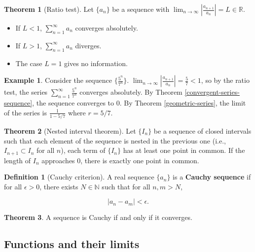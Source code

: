 \documentclass{article}
\theoremstyle{definition}
\newtheorem{definition}{Definition}[section]
\newtheorem{example}{Example}[section]
\newtheorem{theorem}{Theorem}[section]
\begin{document}
\begin{theorem}[Ratio test]
Let $\{a_n\}$ be a sequence with $\lim_{n \to \infty} |\frac{a_{n+1}}{a_n}| = L \in \mathbb{R}$.

\begin{itemize}
\item If $L < 1$, $\sum\limits_{n=1}^\infty a_n$ converges absolutely.
\item If $L > 1$, $\sum\limits_{n=1}^\infty a_n$ diverges.
\item The case $L = 1$ gives no information.
\end{itemize}
\end{theorem}

\begin{example}
Consider the sequence $\{\frac{5^n}{7^n}\}$. $\lim_{n \to \infty} |\frac{a_{n+1}}{a_n}| = \frac{5}{7} < 1$, so by the ratio test, the series $\sum\limits_{n=1}^\infty \frac{5^n}{7^n}$ converges absolutely. By Theorem \ref{convergent-series-sequence}, the sequence converges to 0. By Theorem \ref{geometric-series}, the limit of the series is $\frac{1}{1-5/7}$ where $r = 5/7$.
\end{example}

\begin{theorem}[Nested interval theorem]
Let $\{I_n\}$ be a sequence of closed intervals such that each element of the sequence is nested in the previous one (i.e., $I_{n+1} \subset I_n$ for all $n$), each term of $\{I_n\}$ has at least one point in common. If the length of $I_n$ approaches 0, there is exactly one point in common.
\end{theorem}

\begin{definition}[Cauchy criterion]
A real sequence $\{a_n\}$ is a \textbf{Cauchy sequence} if for all $\epsilon > 0$, there exists $N \in \mathbb{N}$ such that for all $n, m > N$, 

\begin{equation}
|a_n - a_m| < \epsilon.
\end{equation}
\end{definition}

\begin{theorem}
A sequence is Cauchy if and only if it converges.
\end{theorem}

\subsection{Functions and their limits}
\end{document}
